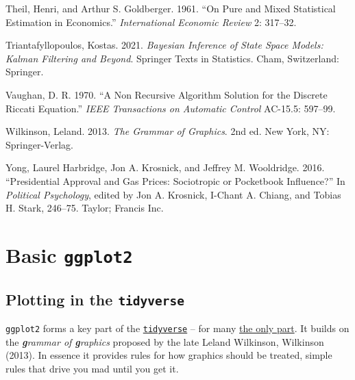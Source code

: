 \documentclass[
  letterpaper,
]{book}
\newlength{\cslhangindent}
\newlength{\cslentryspacingunit} %
\newenvironment{CSLReferences}[2] %
 {%
  \setlength{\parindent}{0pt}
  \ifodd #1
  \let\oldpar\par
  \def\par{\hangindent=\cslhangindent\oldpar}
  \fi
  \setlength{\parskip}{#2\cslentryspacingunit}
 }%
 {}
\begin{document}
\begin{CSLReferences}{1}{0}
\leavevmode{}%
Theil, Henri, and Arthur S. Goldberger. 1961. {``On Pure and Mixed
Statistical Estimation in Economics.''} \emph{International Economic
Review} 2: 317--32.

\leavevmode{}%
Triantafyllopoulos, Kostas. 2021. \emph{Bayesian Inference of State
Space Models: Kalman Filtering and Beyond}. Springer Texts in
Statistics. Cham, Switzerland: Springer.

\leavevmode{}%
Vaughan, D. R. 1970. {``A Non Recursive Algorithm Solution for the
Discrete Riccati Equation.''} \emph{IEEE Transactions on Automatic
Control} AC-15.5: 597--99.

\leavevmode{}%
Wilkinson, Leland. 2013. \emph{The Grammar of Graphics}. 2nd ed. New
York, NY: Springer-Verlag.

\leavevmode{}%
Yong, Laurel Harbridge, Jon A. Krosnick, and Jeffrey M. Wooldridge.
2016. {``Presidential Approval and Gas Prices: Sociotropic or Pocketbook
Influence?''} In \emph{Political Psychology}, edited by Jon A. Krosnick,
I-Chant A. Chiang, and Tobias H. Stark, 246--75. Taylor; Francis Inc.

\end{CSLReferences}

\cleardoublepage
{}
{}
\appendix

\hypertarget{basic-ggplot2}{%
\chapter{\texorpdfstring{Basic
\texttt{ggplot2}}{Basic ggplot2}}\label{basic-ggplot2}}

\hypertarget{plotting-in-the-tidyverse}{%
\section{\texorpdfstring{Plotting in the
\texttt{tidyverse}}{Plotting in the tidyverse}}\label{plotting-in-the-tidyverse}}

\texttt{ggplot2} forms a key part of the
\href{https://www.tidyverse.org/}{\texttt{tidyverse}}
-- for many \href{https://en.wikipedia.org/wiki/ggplot2}{the only part}.
It builds on the \emph{\textbf{g}rammar of \textbf{g}raphics} proposed
by the late Leland Wilkinson, Wilkinson (2013). In essence it provides
rules for how graphics should be treated, simple rules that drive you
mad until you get it.
\end{document}

